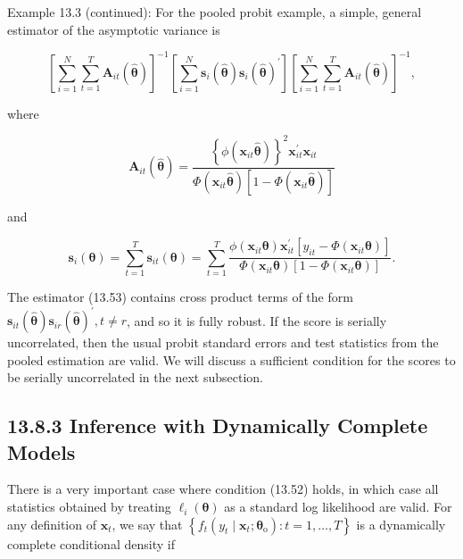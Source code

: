 \documentclass[10pt]{article}
\begin{document}
Example 13.3 (continued): For the pooled probit example, a simple, general estimator of the asymptotic variance is


\begin{equation*}
\left[\sum_{i=1}^{N} \sum_{t=1}^{T} \mathbf{A}_{i t}(\hat{\boldsymbol{\theta}})\right]^{-1}\left[\sum_{i=1}^{N} \mathbf{s}_{i}(\hat{\boldsymbol{\theta}}) \mathbf{s}_{i}(\hat{\boldsymbol{\theta}})^{\prime}\right]\left[\sum_{i=1}^{N} \sum_{t=1}^{T} \mathbf{A}_{i t}(\hat{\boldsymbol{\theta}})\right]^{-1}, \tag{13.53}
\end{equation*}


where

$$
\mathbf{A}_{i t}(\hat{\boldsymbol{\theta}})=\frac{\left\{\phi\left(\mathbf{x}_{i t} \hat{\boldsymbol{\theta}}\right)\right\}^{2} \mathbf{x}_{i t}^{\prime} \mathbf{x}_{i t}}{\Phi\left(\mathbf{x}_{i t} \hat{\boldsymbol{\theta}}\right)\left[1-\Phi\left(\mathbf{x}_{i t} \hat{\boldsymbol{\theta}}\right)\right]}
$$

and

$$
\mathbf{s}_{i}(\boldsymbol{\theta})=\sum_{t=1}^{T} \mathbf{s}_{i t}(\boldsymbol{\theta})=\sum_{t=1}^{T} \frac{\phi\left(\mathbf{x}_{i t} \boldsymbol{\theta}\right) \mathbf{x}_{i t}^{\prime}\left[y_{i t}-\Phi\left(\mathbf{x}_{i t} \boldsymbol{\theta}\right)\right]}{\Phi\left(\mathbf{x}_{i t} \boldsymbol{\theta}\right)\left[1-\Phi\left(\mathbf{x}_{i t} \boldsymbol{\theta}\right)\right]} .
$$

The estimator (13.53) contains cross product terms of the form $\mathbf{s}_{i t}(\hat{\boldsymbol{\theta}}) \mathbf{s}_{i r}(\hat{\boldsymbol{\theta}})^{\prime}, t \neq r$, and so it is fully robust. If the score is serially uncorrelated, then the usual probit standard errors and test statistics from the pooled estimation are valid. We will discuss a sufficient condition for the scores to be serially uncorrelated in the next subsection.

\subsection*{13.8.3 Inference with Dynamically Complete Models}
There is a very important case where condition (13.52) holds, in which case all statistics obtained by treating $\ell_{i}(\boldsymbol{\theta})$ as a standard log likelihood are valid. For any definition of $\mathbf{x}_{t}$, we say that $\left\{f_{t}\left(y_{t} \mid \mathbf{x}_{t} ; \boldsymbol{\theta}_{\mathrm{o}}\right): t=1, \ldots, T\right\}$ is a dynamically complete conditional density if
\end{document}
